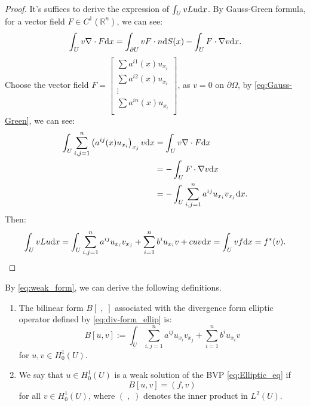 \begin{proof}
    It's suffices to derive the expression of $\int_{U}vLu\mathrm{d} x$. By Gauss-Green formula, for a vector field $F\in C^{1}(\mathbb{R}^{n})$, we can see:
    \begin{equation}
        \label{eq:Gauss-Green}
        \int_{U}v\nabla\cdot F\mathrm{d} x=\int_{\partial U}v F\cdot n\mathrm{d} S(x)-\int_{U}F\cdot\nabla v\mathrm{d} x.
    \end{equation}
    Choose the vector field $F=\begin{bmatrix}
        \sum a^{i1}(x)u_{x_{i}}\\
        \sum a^{i2}(x)u_{x_{i}}\\
        \vdots\\
        \sum a^{in}(x)u_{x_{i}}\\
    \end{bmatrix}$, as $v=0$ on $\partial \Omega$, by \eqref{eq:Gauss-Green}, we can see:
    \begin{equation}
        \begin{aligned}
            \int_{U}\sum_{i,j=1}^{n}\left(a^{ij}(x)u_{x_{i}}\right)_{x_{j}}v\mathrm{d} x&=\int_{U}v\nabla\cdot F\mathrm{d} x\\
            &=-\int_{U}F\cdot\nabla v\mathrm{d} x\\
            &=-\int_{U}\sum_{i,j=1}^{n}a^{ij}u_{x_{i}}v_{x_{j}}\mathrm{d} x.\\
        \end{aligned}
    \end{equation}
    Then:
    \begin{equation}
        \label{eq:weak}
        \int_{U}vLu\mathrm{d} x=\int_{U}\sum_{i,j=1}^{n}a^{ij}u_{x_{i}}v_{x_{j}}+\sum_{i=1}^{n}b^{i}u_{x_{i}}v+cuv\mathrm{d} x=\int_{U}vf\mathrm{d} x=f^{*}(v).
    \end{equation}
\end{proof}
By \eqref{eq:weak_form}, we can derive the following definitions.
\begin{definition}
    \begin{enumerate}
        \item The bilinear form $B[\;,\;]$ associated with the divergence form elliptic operator defined by \eqref{eq:div-form_ellip} is:
        \begin{equation}
            \label{eq:bilinear_form_B1}
            B[u,v]:=\int_{U}\sum_{i,j=1}^{n}a^{ij}u_{x_{i}}v_{x_{j}}+\sum_{i=1}^{n}b^{i}u_{x_{i}}v
        \end{equation}
        for $u,v\in H_{0}^{1}(U)$.
        \item We say that $u\in H_{0}^{1}(U)$ is a weak solution of the BVP \eqref{eq:Elliptic_eq} if 
        \begin{equation}
            B[u,v]=(f,v)
        \end{equation}
        for all $v\in H_{0}^{1}(U)$, where $(\;,\;)$ denotes the inner product in $L^{2}(U)$.
    \end{enumerate}
\end{definition}

